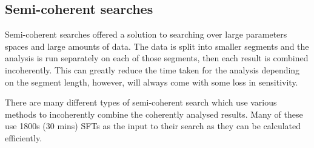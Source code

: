 \subsection{\label{intro:search:semicoherent}Semi-coherent searches}

Semi-coherent searches offered a solution to searching over large parameters spaces and large amounts of data. 
The data is split into smaller segments and the analysis is run separately on each of those segments, then each result is combined incoherently. 
This can greatly reduce the time taken for the analysis depending on the segment length, however, will always come with some loss in sensitivity. 

There are many different types of semi-coherent search which use various methods to incoherently combine the coherently analysed results. Many of these use 1800s (30 mins) \acp{SFT} as the input to their search as they can be calculated efficiently. 

